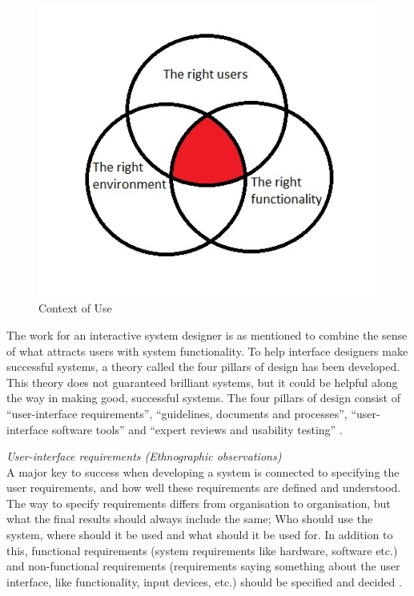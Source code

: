 \begin{figure} [ht!]
\centering
\includegraphics[scale=0.8]{contextOfUse.jpg}
\caption{Context of Use}
\label{contextofuse}
\end{figure}  
  
The work for an interactive system designer is as mentioned to combine the sense of what attracts users with system functionality. To help interface designers make successful systems, a theory called the four pillars of design has been developed. This theory does not guaranteed brilliant systems, but it could be helpful along the way in making good, successful systems. The four pillars of design consist of “user-interface requirements”, “guidelines, documents and processes”, “user-interface software tools” and “expert reviews and usability testing” \cite{mmi}.    

\emph{User-interface requirements (Ethnographic observations)}\\
A major key to success when developing a system is connected to specifying the user requirements, and how well these requirements are defined and understood.  The way to specify requirements differs from organisation to organisation, but what the final results should always include the same; Who should use the system, where should it be used and what should it be used for. In addition to this, functional requirements (system requirements like hardware,  software etc.) and non-functional requirements (requirements saying something about the user interface, like functionality, input devices, etc.) should be specified and decided \cite{mmi}.

